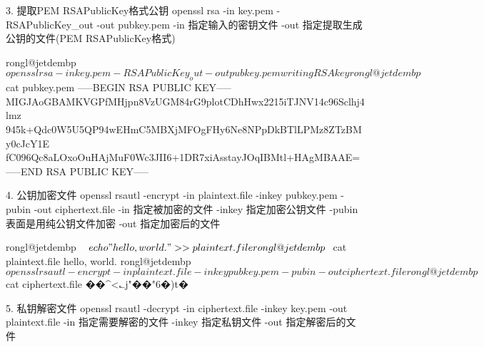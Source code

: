 3. 提取PEM RSAPublicKey格式公钥
openssl rsa -in key.pem -RSAPublicKey_out -out pubkey.pem
    -in 指定输入的密钥文件
    -out 指定提取生成公钥的文件(PEM RSAPublicKey格式)

    rongl@jetdembp ~ $ openssl rsa -in key.pem -RSAPublicKey_out -out pubkey.pem
    writing RSA key
    rongl@jetdembp ~ $ cat pubkey.pem
    -----BEGIN RSA PUBLIC KEY-----
    MIGJAoGBAMKVGPfMHjpn8VzUGM84rG9plotCDhHwx2215iTJNV14c96Sclhj4lmz
    945k+Qdc0W5U5QP94wEHmC5MBXjMFOgFHy6Ne8NPpDkBTlLPMz8ZTzBMy0cJcY1E
    fC096Qc8aLOxoOuHAjMuF0Wc3JII6+1DR7xiAsstayJOqIBMtl+HAgMBAAE=
    -----END RSA PUBLIC KEY-----


4. 公钥加密文件
openssl rsautl -encrypt -in plaintext.file -inkey pubkey.pem -pubin -out ciphertext.file
    -in 指定被加密的文件
    -inkey 指定加密公钥文件
    -pubin 表面是用纯公钥文件加密
    -out 指定加密后的文件

    rongl@jetdembp ~ $ echo "hello, world." >> plaintext.file
    rongl@jetdembp ~ $ cat plaintext.file
    hello, world.
    rongl@jetdembp ~ $ openssl rsautl -encrypt -in plaintext.file -inkey pubkey.pem -pubin -out ciphertext.file
    rongl@jetdembp ~ $ cat ciphertext.file
    ��^<؎j"��"6�)t�%


5. 私钥解密文件
openssl rsautl -decrypt -in ciphertext.file -inkey key.pem -out plaintext.file
    -in 指定需要解密的文件
    -inkey 指定私钥文件
    -out 指定解密后的文件

